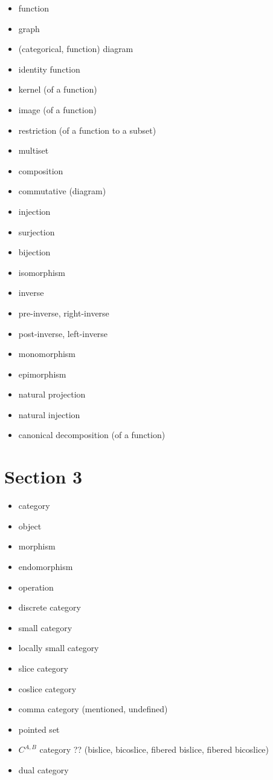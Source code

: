 \documentclass[12pt, letterpaper, twoside]{report}
\begin{document}
\begin{itemize}
	\item function
	\item graph
	\item (categorical, function) diagram
	\item identity function
	\item kernel (of a function)
	\item image (of a function)
	\item restriction (of a function to a subset)
	\item multiset
	\item composition
	\item commutative (diagram)
	\item injection
	\item surjection
	\item bijection
	\item isomorphism
	\item inverse
	\item pre-inverse, right-inverse
	\item post-inverse, left-inverse
	\item monomorphism
	\item epimorphism
	\item natural projection
	\item natural injection
	\item canonical decomposition (of a function)
\end{itemize}


\section*{Section 3}

\begin{itemize}
	\item category
	\item object
	\item morphism
	\item endomorphism
	\item operation
	\item discrete category
	\item small category
	\item locally small category
	\item slice category
	\item coslice category
	\item comma category (mentioned, undefined)
	\item pointed set
	\item $C^{A, B}$ category ?? (bislice, bicoslice, fibered bislice, fibered bicoslice)
	\item dual category
\end{itemize}
\end{document}
